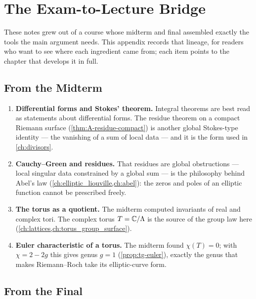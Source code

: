 \chapter{The Exam-to-Lecture Bridge}
\label{app:B}

These notes grew out of a course whose midterm and final assembled exactly the
tools the main argument needs. This appendix records that lineage, for readers who
want to see where each ingredient came from; each item points to the chapter that
develops it in full.

\section{From the Midterm}
\label{sec:B-midterm}

\begin{enumerate}
\item \textbf{Differential forms and Stokes' theorem.} Integral theorems are best
read as statements about differential forms. The residue theorem on a compact
Riemann surface (\cref{thm:A-residue-compact}) is another global Stokes-type
identity --- the vanishing of a sum of local data --- and it is the form used in
\cref{ch:divisors}.

\item \textbf{Cauchy--Green and residues.} That residues are global obstructions
--- local singular data constrained by a global sum --- is the philosophy behind
Abel's law (\cref{ch:elliptic_liouville,ch:abel}): the zeros and poles of an
elliptic function cannot be prescribed freely.

\item \textbf{The torus as a quotient.} The midterm computed invariants of real
and complex tori. The complex torus \(T = \mathbb{C}/\Lambda\) is the source of the group
law here (\cref{ch:lattices,ch:torus_group_surface}).

\item \textbf{Euler characteristic of a torus.} The midterm found \(\chi(T) = 0\);
with \(\chi = 2 - 2g\) this gives genus \(g = 1\) (\cref{prop:tg-euler}), exactly
the genus that makes Riemann--Roch take its elliptic-curve form.
\end{enumerate}

\section{From the Final}
\label{sec:B-final}

